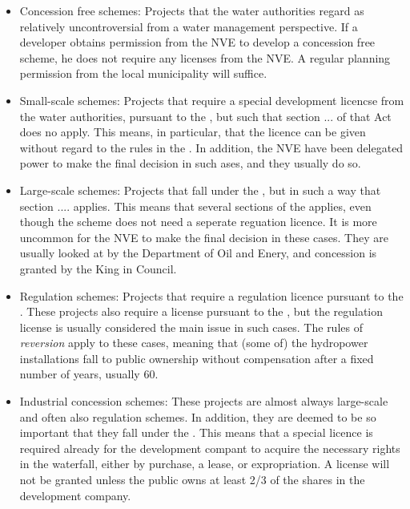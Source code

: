 \begin{itemize}
\item Concession free schemes: Projects that the water authorities regard as relatively uncontroversial from a water management perspective. If a developer obtains permission from the NVE to develop a concession free scheme, he does not require any licenses from the NVE. A regular planning permission from the local municipality will suffice.
\item Small-scale schemes: Projects that require a special development licencse from the water authorities, pursuant to the \cite{wra00}, but such that section ... of that Act does no apply. This means, in particular, that the licence can be given without regard to the rules in the \cite{wra17}. In addition, the NVE have been delegated power to make the final decision in such ases, and they usually do so.
\item Large-scale schemes: Projects that fall under the \cite{wra00}, but in such a way that section .... applies. This means that several sections of the \cite{wra17} applies, even though the scheme does not need a seperate reguation licence. It is more uncommon for the NVE to make the final decision in these cases. They are usually looked at by the Department of Oil and Enery, and concession is granted by the King in Council. 
\item Regulation schemes: Projects that require a regulation licence pursuant to the \cite{wra17}. These projects also require a license pursuant to the \cite{wra00}, but the regulation license is usually considered the main issue in such cases. The rules of {\it reversion} apply to these cases, meaning that (some of) the hydropower installations fall to public ownership without compensation after a fixed number of years, usually 60.
\item Industrial concession schemes: These projects are almost always large-scale and often also regulation schemes. In addition, they are deemed to be so important that they fall under the \cite{ica17}. This means that a special licence is required already for the development compant to acquire the necessary rights in the waterfall, either by purchase, a lease, or expropriation. A license will not be granted unless the public owns at least 2/3 of the shares in the development company.
\end{itemize}

